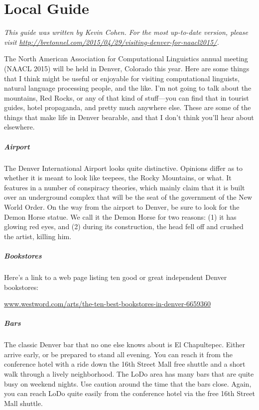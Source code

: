 \chapter{Local Guide}

\emph{This guide was written by Kevin Cohen. For the most up-to-date
  version, please visit
  \url{http://bretonnel.com/2015/04/29/visiting-denver-for-naacl2015/}.}

The North American Association for Computational Linguistics annual
meeting (NAACL 2015) will be held in Denver, Colorado this year. Here
are some things that I think might be useful or enjoyable for visiting
computational linguists, natural language processing people, and the
like. I'm not going to talk about the mountains, Red Rocks, or any of
that kind of stuff---you can find that in tourist guides, hotel
propaganda, and pretty much anywhere else.  These are some of the
things that make life in Denver bearable, and that I don't think
you'll hear about elsewhere.

\paragraph{Airport}

The Denver International Airport looks quite distinctive. Opinions
differ as to whether it is meant to look like teepees, the Rocky
Mountains, or what. It features in a number of conspiracy theories,
which mainly claim that it is built over an underground complex that
will be the seat of the government of the New World Order. On the way
from the airport to Denver, be sure to look for the Demon Horse
statue. We call it the Demon Horse for two reasons: (1) it has glowing
red eyes, and (2) during its construction, the head fell off and
crushed the artist, killing him.

\paragraph{Bookstores}

Here's a link to a web page listing ten good or great independent
Denver bookstores:

\url{www.westword.com/arts/the-ten-best-bookstores-in-denver-6659360}

\paragraph{Bars}

The classic Denver bar that no one else knows about is El Chapultepec.
Either arrive early, or be prepared to stand all evening. You can
reach it from the conference hotel with a ride down the 16th Street
Mall free shuttle and a short walk through a lively neighborhood. The
LoDo area has many bars that are quite busy on weekend nights. Use
caution around the time that the bars close. Again, you can reach
LoDo quite easily from the conference hotel via the free 16th Street
Mall shuttle.

